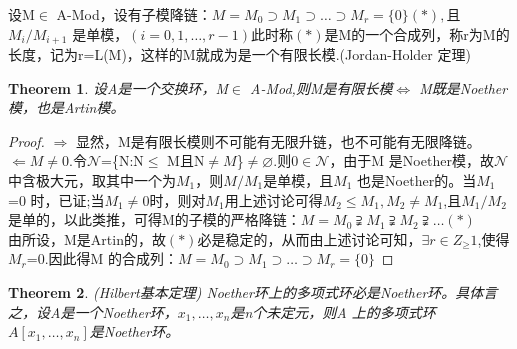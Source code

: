 \documentclass[UTF8]{article}
\newtheorem{thm}{Theorem}[section]
\begin{document}
设M$\in$ A-Mod，设有子模降链：$M=M_0\supset M_1\supset\ldots\supset M_r=\{0\}(\ast),$且$M_i/M_{i+1}$ 是单模，$(i=0,1,\ldots,r-1)$此时称$(\ast)$是M的一个合成列，称r为M的长度，记为r=L(M)，这样的M就成为是一个有限长模.(Jordan-Holder 定理)\\
\begin{thm}
	设A是一个交换环，M$\in$ A-Mod,则M是有限长模$\Leftrightarrow$ M既是Noether模，也是Artin模。
\end{thm}
\begin{proof}
	$\Rightarrow$ 显然，M是有限长模则不可能有无限升链，也不可能有无限降链。
	$\Leftarrow M\neq0$.令$\mathscr{N}$=\{N:N$\leq$ M且N$\neq M$\}$\neq\varnothing$.则$0\in\mathscr{N}$，由于M 是Noether模，故$\mathscr{N}$中含极大元，取其中一个为$M_1$，则$M/M_1$是单模，且$M_1$ 也是Noether的。当$M_1$=0 时，已证;当$M_1\neq0$时，则对$M_1$用上述讨论可得$M_2\leq M_1,M_2\neq M_1$,且$M_1/M_2$是单的，以此类推，可得M的子模的严格降链：$M=M_0\supsetneqq M_1\supsetneqq M_2\supsetneqq\ldots(\ast)$\\
	由所设，M是Artin的，故$(\ast)$必是稳定的，从而由上述讨论可知，$\exists r\in Z_\geq1$,使得$M_r$=0.因此得M 的合成列：$M=M_0\supset M_1\supset\ldots\supset M_r=\{0\}$
\end{proof}
\begin{thm}{(Hilbert基本定理)}
	Noether环上的多项式环必是Noether环。具体言之，设A是一个Noether环，$x_1,\ldots,x_n$是n个未定元，则A 上的多项式环$A[x_1,\ldots,x_n]$是Noether环。
\end{thm}
\end{document}
